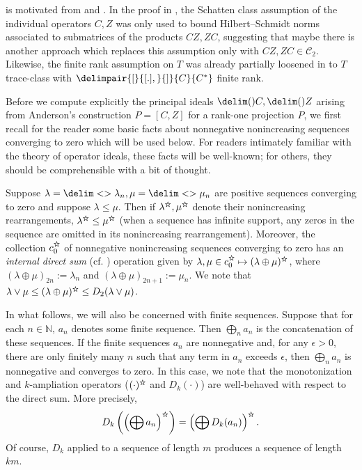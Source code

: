 \documentclass[10pt,reqno]{amsart}
\theoremstyle{remark}
\newcommand\openbigstar[1][0.65]{%
  \scalerel*{%
    \stackinset{c}{0pt}{c}{}{\scalebox{#1}{\color{white}{$\bigstar$}}}{%
      $\bigstar$}%
  }{\bigstar}
}
\newcommand{\seq}{\delim<>}
\newcommand{\ideal}{\delim()}
\newcommand{\comm}{\delimpair{[}{[.],}{]}}
\newcommand{\schatten}[1]{\mathcal{C}_{#1}}
\renewcommand{\star}{\openbigstar}
\newcommand{\czstar}{c_0^{\star}}
\numberwithin{equation}{section}
\begin{document}
 is motivated from  and \cite{Bro-1994-JRAM}.
In the proof in \cite{Bro-1994-JRAM}, the Schatten class assumption of the individual operators $C, Z$ was only used to bound Hilbert--Schmidt norms associated to submatrices of the products $CZ, ZC$, suggesting that maybe there is another approach which replaces this assumption only with $CZ, ZC \in \schatten{2}$.
Likewise, the finite rank assumption on $T$ was already partially loosened in \cite{Bro-1994-JRAM} to $T$ trace-class with $\comm{C}{C^{*}}$ finite rank.

Before we compute explicitly the principal ideals $\ideal{C}, \ideal{Z}$ arising from Anderson's construction $P = [C,Z]$ for a rank-one projection $P$, we first recall for the reader some basic facts about nonnegative nonincreasing sequences converging to zero which will be used below.
For readers intimately familiar with the theory of operator ideals, these facts will be well-known;
for others, they should be comprehensible with a bit of thought.

Suppose $\lambda = \seq{\lambda_n}, \mu = \seq{\mu_n}$ are positive sequences converging to zero and suppose $\lambda \le \mu$.
Then if $\lambda^{\star}, \mu^{\star}$ denote their nonincreasing rearrangements, $\lambda^{\star} \le \mu^{\star}$ (when a sequence has infinite support, any zeros in the sequence are omitted in its nonincreasing rearrangement).
Moreover, the collection $\czstar$ of nonnegative nonincreasing sequences converging to zero has an \emph{internal direct sum} (cf. \cite[]{DFWW-2004-AM}) operation given by $\lambda, \mu \in \czstar \mapsto (\lambda \oplus \mu)^{\star}$, where $(\lambda \oplus \mu)_{2n} := \lambda_n$ and $(\lambda \oplus \mu)_{2n+1} := \mu_n$.
We note that $\lambda \vee \mu \le (\lambda \oplus \mu)^{\star} \le D_2(\lambda \vee \mu)$.

In what follows, we will also be concerned with finite sequences.
Suppose that for each $n \in \mathbb{N}$, $a_n$ denotes some finite sequence.
Then $\bigoplus_n a_n$ is the concatenation of these sequences.
If the finite sequences $a_n$ are nonnegative and, for any $\epsilon > 0$, there are only finitely many $n$ such that any term in $a_n$ exceeds $\epsilon$, then $\bigoplus_n a_n$ is nonnegative and converges to zero.
In this case, we note that the monotonization and $k$-ampliation operators ($(\cdot)^{\star}$ and $D_k(\cdot)$) are well-behaved with respect to the direct sum.
More precisely,
\begin{equation*}
  D_k \left( \left( \bigoplus a_n \right)^{\star} \right) = \left( \bigoplus D_k(a_n) \right)^{\star}.
\end{equation*}
Of course, $D_k$ applied to a sequence of length $m$ produces a sequence of length $km$.
\end{document}
